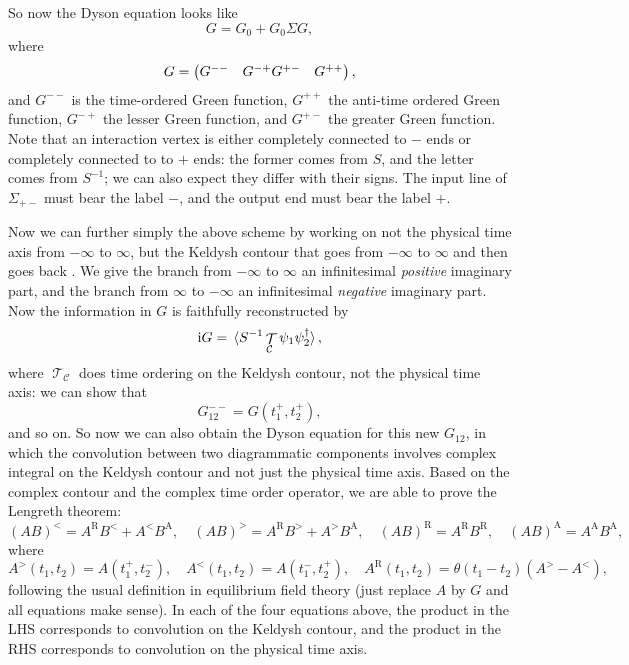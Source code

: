 \documentclass[hyperref, a4paper]{article}
\DeclareMathOperator{\timeorder}{\mathcal{T}}
\newcommand*{\ii}{\mathrm{i}}
\def\\{}%
\begin{document}
So now the Dyson equation looks like 
\begin{equation}
    G = G_0 + G_0 \Sigma G, 
\end{equation}
where 
\begin{equation}
    G = \pmqty{
        G^{--} & G^{-+} \\ 
        G^{+-} & G^{++}
    }   ,
\end{equation}
and $G^{--}$ is the time-ordered Green function,
$G^{++}$ the anti-time ordered Green function,
$G^{-+}$ the lesser Green function,
and $G^{+-}$ the greater Green function.
Note that an interaction vertex is either completely connected to $-$ ends
or completely connected to to $+$ ends:
the former comes from $S$,
and the letter comes from $S^{-1}$;
we can also expect they differ with their signs.
The input line of $\Sigma_{+-}$ must bear the label $-$,
and the output end must bear the label $+$.

Now we can further simply the above scheme by working on 
not the physical time axis from $-\infty$ to $\infty$,
but the Keldysh contour that goes from $-\infty$ to $\infty$ 
and then goes back \cite{kremp2005quantum}.
We give the branch from $-\infty$ to $\infty$ an infinitesimal \emph{positive} imaginary part,
and the branch from $\infty$ to $-\infty$ an infinitesimal \emph{negative} imaginary part.
Now the information in $G$ is faithfully reconstructed by 
\begin{equation}
    \ii G = \expval*{S^{-1} \timeorder_{\mathcal{C}} \psi_1 \psi_2^\dagger},
\end{equation}
where $\timeorder_{\mathcal{C}}$ does time ordering on the Keldysh contour,
not the physical time axis:
we can show that 
\begin{equation}
    G^{--}_{12} = G(t_1^+, t_2^+), 
\end{equation}
and so on.
So now we can also obtain the Dyson equation for this new $G_{12}$,
in which the convolution between two diagrammatic components 
involves complex integral on the Keldysh contour 
and not just the physical time axis.
Based on the complex contour and the complex time order operator,
we are able to prove the Lengreth theorem:
\begin{equation}
    (AB)^< = A^{\text{R}} B^< + A^< B^{\text{A}}, \quad 
    (AB)^> = A^{\text{R}} B^> + A^> B^{\text{A}}, \quad 
    (AB)^{\text{R}} = A^{\text{R}} B^{\text{R}}, \quad 
    (AB)^{\text{A}} = A^{\text{A}} B^{\text{A}},
\end{equation}
where 
\begin{equation}
    A^>(t_1, t_2) = A(t_1^+, t_2^-), \quad 
    A^<(t_1, t_2) = A(t_1^-, t_2^+), \quad 
    A^{\text{R}}(t_1, t_2) = \theta(t_1 - t_2) (A^> - A^<),
    \label{eq:def-l-g-a-r}
\end{equation}
following the usual definition in equilibrium field theory 
(just replace $A$ by $G$ and all equations make sense).
In each of the four equations above, 
the product in the LHS corresponds to 
convolution on the Keldysh contour,
and the product in the RHS corresponds to 
convolution on the physical time axis.
\end{document}
